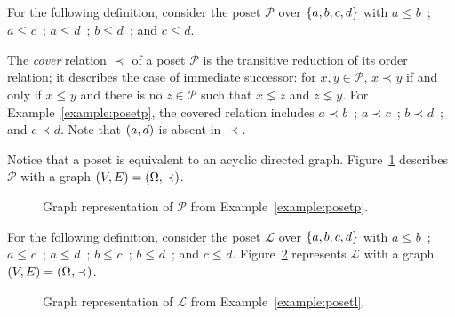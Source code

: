 \documentclass[12pt]{llncs}
\DeclarePairedDelimiter{\set}{\{}{\}}
\DeclarePairedDelimiter{\tuple}{(}{)}
\let\oldleq\leq
\renewcommand{\leq}[1][]{\oldleq_{#1}}
\newcommand{\poset}[1]{\mathcal{#1}}
\newcommand{\uni}[1][]{\Omega_{#1}}
\newcommand{\covered}[1][]{\prec_{#1}}
\begin{document}
\begin{example}
    For the following definition, consider the poset $\poset{P}$ over $\set{a,b,c,d}$ with $a \leq b$\ ; $a \leq c$\ ; $a \leq d$\ ; $b \leq d$\ ; and $c \leq d$.
    \label{example:posetp}
\end{example}

The \emph{cover} relation $\covered$ of a poset $\poset{P}$ is the transitive reduction of its order relation; it describes the case of immediate successor: for $x, y \!\in\! \poset{P}$, $x \covered y$ if and only if $x \leq y$ and there is no $z \!\in\! \poset{P}$ such that $x \lneq z$ and $z \lneq y$. For Example~\ref{example:posetp}, the covered relation includes $a \covered b$\ ; $a \covered c$\ ; $b \covered d$\ ; and $c \covered d$. Note that $\tuple{a,d}$ is absent in $\covered$.

Notice that a poset is equivalent to an acyclic directed graph. Figure~\ref{figure:posetp} describes $\poset{P}$ with a graph $\tuple{V,E} = \tuple{\Omega,\covered}$.

\begin{figure}[h]
    \centering
    \caption{Graph representation of $\poset{P}$ from Example~\ref{example:posetp}.}
    \label{figure:posetp}
\end{figure}

\begin{example}
    For the following definition, consider the poset $\poset{L}$ over $\set{a,b,c,d}$ with $a \leq b$\ ; $a \leq c$\ ; $a \leq d$\ ; $b \leq c$\ ; $b \leq d$\ ; and $c \leq d$. Figure~\ref{figure:posetl} represents $\poset{L}$ with a graph $\tuple{V,E} = \tuple{\uni,\covered}$.
    \label{example:posetl}
\end{example}

\begin{figure}[h]
    \centering
    \caption{Graph representation of $\poset{L}$ from Example~\ref{example:posetl}.}
    \label{figure:posetl}
\end{figure}
\end{document}
